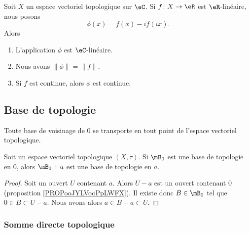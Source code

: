 \begin{proposition}	\label{PROPooQMGXooBnJblx}
	Soit \( X\) un espace vectoriel topologique sur \( \eC\). Si \(f \colon X\to \eR  \) est \( \eR\)-linéaire, nous posons
	\begin{equation}
		\phi(x)=f(x)-if(ix).
	\end{equation}
	Alors
	\begin{enumerate}
		\item
		      L'application \( \phi\) est \( \eC\)-linéaire.
		\item
		      Nous avons \( \| \phi \|=\| f \|\).
		\item
		      Si \( f\) est continue, alors \( \phi\) est continue.
	\end{enumerate}
\end{proposition}


\subsection{Base de topologie}

Toute base de voisinage de \( 0 \) se transporte en tout point de l'espace vectoriel topologique.
\begin{corollary}\label{PropInvarianceTopologie}
	Soit un espace vectoriel topologique \( (X,\tau)\). Si \( \mB_0\) est une base de topologie en \( 0\), alors \( \mB_0+a\) est une base de topologie en \( a\).
\end{corollary}

\begin{proof}
	Soit un ouvert \( U\) contenant \( a\). Alors \( U-a\) est un ouvert contenant \( 0\) (proposition \ref{PROPooJYLVooPpLWFX}). Il existe donc \( B\in\mB_0\) tel que \( 0\in B\subset U-a\). Nous avons alors \( a\in B+a\subset U\).
\end{proof}

\subsubsection{Somme directe topologique}

